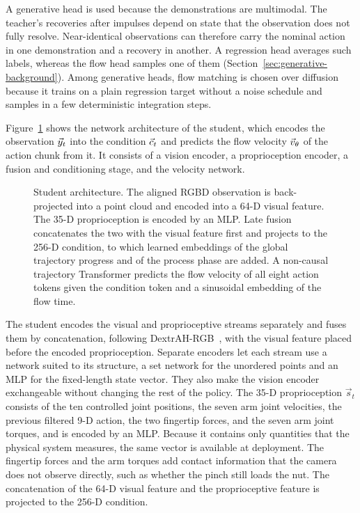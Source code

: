 A generative head is used because the demonstrations are multimodal. The teacher's recoveries after impulses depend on state that the observation does not fully resolve. Near-identical observations can therefore carry the nominal action in one demonstration and a recovery in another. A regression head averages such labels, whereas the flow head samples one of them (Section~\ref{sec:generative-background}). Among generative heads, flow matching is chosen over diffusion because it trains on a plain regression target without a noise schedule and samples in a few deterministic integration steps.

Figure~\ref{fig:student} shows the network architecture of the student, which encodes the observation $\vec{y}_t$ into the condition $\vec{c}_t$ and predicts the flow velocity $\vec{v}_{\theta}$ of the action chunk from it. It consists of a vision encoder, a proprioception encoder, a fusion and conditioning stage, and the velocity network.

\begin{figure}[htb]%
    \centering%
    \caption{Student architecture. The aligned \acs{RGBD} observation is back-projected into a point cloud and encoded into a 64-D visual feature. The 35-D proprioception is encoded by an \acs{MLP}. Late fusion concatenates the two with the visual feature first and projects to the 256-D condition, to which learned embeddings of the global trajectory progress and of the process phase are added. A non-causal trajectory Transformer predicts the flow velocity of all eight action tokens given the condition token and a sinusoidal embedding of the flow time.}%
    \label{fig:student}%
\end{figure}%

The student encodes the visual and proprioceptive streams separately and fuses them by concatenation, following DextrAH-RGB~\cite{Singh2025}, with the visual feature placed before the encoded proprioception. Separate encoders let each stream use a network suited to its structure, a set network for the unordered points and an \acs{MLP} for the fixed-length state vector. They also make the vision encoder exchangeable without changing the rest of the policy. The 35-D proprioception $\vec{s}_t$ consists of the ten controlled joint positions, the seven arm joint velocities, the previous filtered 9-D action, the two fingertip forces, and the seven arm joint torques, and is encoded by an \acs{MLP}. Because it contains only quantities that the physical system measures, the same vector is available at deployment. The fingertip forces and the arm torques add contact information that the camera does not observe directly, such as whether the pinch still loads the nut. The concatenation of the 64-D visual feature and the proprioceptive feature is projected to the 256-D condition.

